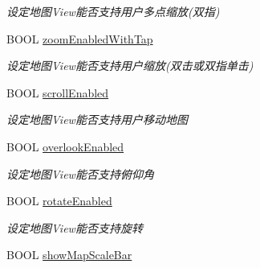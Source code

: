 \begin{DoxyCompactItemize}
\begin{DoxyCompactList}\small\item\em 设定地图\+View能否支持用户多点缩放(双指) \end{DoxyCompactList}\item 
\hypertarget{interface_b_m_k_map_view_a11368ac9a8b66b2bc1c3e552e368939e}{B\+O\+O\+L \hyperlink{interface_b_m_k_map_view_a11368ac9a8b66b2bc1c3e552e368939e}{zoom\+Enabled\+With\+Tap}}\label{interface_b_m_k_map_view_a11368ac9a8b66b2bc1c3e552e368939e}

\begin{DoxyCompactList}\small\item\em 设定地图\+View能否支持用户缩放(双击或双指单击) \end{DoxyCompactList}\item 
\hypertarget{interface_b_m_k_map_view_adc7ae3120b0edf096ac0eb42f13ed93a}{B\+O\+O\+L \hyperlink{interface_b_m_k_map_view_adc7ae3120b0edf096ac0eb42f13ed93a}{scroll\+Enabled}}\label{interface_b_m_k_map_view_adc7ae3120b0edf096ac0eb42f13ed93a}

\begin{DoxyCompactList}\small\item\em 设定地图\+View能否支持用户移动地图 \end{DoxyCompactList}\item 
\hypertarget{interface_b_m_k_map_view_a8ab1315eb7dadb7db33f2ac568340dec}{B\+O\+O\+L \hyperlink{interface_b_m_k_map_view_a8ab1315eb7dadb7db33f2ac568340dec}{overlook\+Enabled}}\label{interface_b_m_k_map_view_a8ab1315eb7dadb7db33f2ac568340dec}

\begin{DoxyCompactList}\small\item\em 设定地图\+View能否支持俯仰角 \end{DoxyCompactList}\item 
\hypertarget{interface_b_m_k_map_view_acfd7b4dc9bb05e46ffe477b527c61ce0}{B\+O\+O\+L \hyperlink{interface_b_m_k_map_view_acfd7b4dc9bb05e46ffe477b527c61ce0}{rotate\+Enabled}}\label{interface_b_m_k_map_view_acfd7b4dc9bb05e46ffe477b527c61ce0}

\begin{DoxyCompactList}\small\item\em 设定地图\+View能否支持旋转 \end{DoxyCompactList}\item 
\hypertarget{interface_b_m_k_map_view_ad8768aef899c970e88a4cba6f4f7a1bd}{B\+O\+O\+L \hyperlink{interface_b_m_k_map_view_ad8768aef899c970e88a4cba6f4f7a1bd}{show\+Map\+Scale\+Bar}}\label{interface_b_m_k_map_view_ad8768aef899c970e88a4cba6f4f7a1bd}


\end{DoxyCompactItemize}
